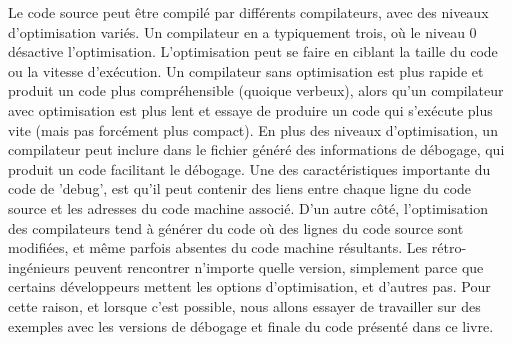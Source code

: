 Le code source peut être compilé par différents compilateurs, avec des niveaux d'optimisation variés.
Un compilateur en a typiquement trois, où le niveau 0 désactive l'optimisation.
L'optimisation peut se faire en ciblant la taille du code ou la vitesse d'exécution.
Un compilateur sans optimisation est plus rapide et produit un code plus compréhensible (quoique verbeux),
alors qu'un compilateur avec optimisation est plus lent et essaye de produire un code qui s'exécute plus
vite (mais pas forcément plus compact).
En plus des niveaux d'optimisation, un compilateur peut inclure dans le fichier généré des informations de
débogage, qui produit un code facilitant le débogage.
Une des caractéristiques importante du code de 'debug', est qu'il peut contenir des liens entre chaque ligne du code source et
les adresses du code machine associé.
D'un autre côté, l'optimisation des compilateurs tend à générer du code où des lignes du code source sont modifiées, et
même parfois absentes du code machine résultants.
Les rétro-ingénieurs peuvent rencontrer n'importe quelle version, simplement parce que certains développeurs mettent les options
d'optimisation, et d'autres pas.
Pour cette raison, et lorsque c'est possible, nous allons essayer de travailler sur des exemples avec les versions de débogage
et finale du code présenté dans ce livre.
